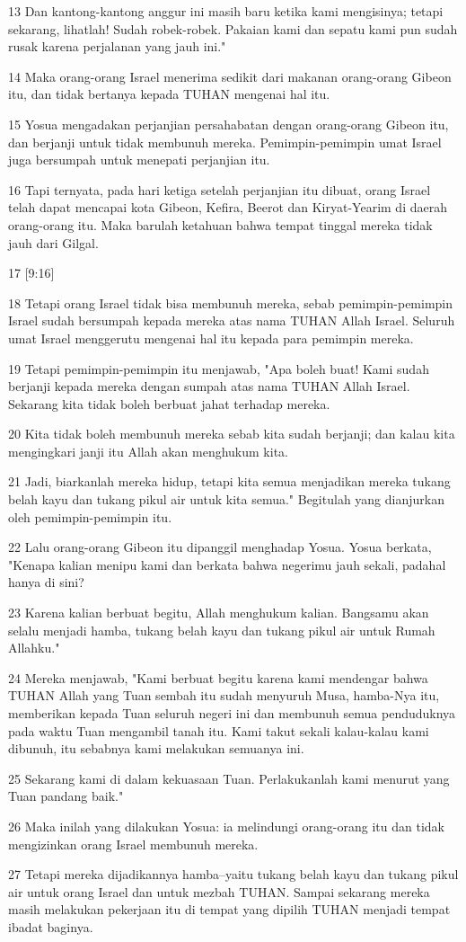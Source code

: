 \par 13 Dan kantong-kantong anggur ini masih baru ketika kami mengisinya; tetapi sekarang, lihatlah! Sudah robek-robek. Pakaian kami dan sepatu kami pun sudah rusak karena perjalanan yang jauh ini."
\par 14 Maka orang-orang Israel menerima sedikit dari makanan orang-orang Gibeon itu, dan tidak bertanya kepada TUHAN mengenai hal itu.
\par 15 Yosua mengadakan perjanjian persahabatan dengan orang-orang Gibeon itu, dan berjanji untuk tidak membunuh mereka. Pemimpin-pemimpin umat Israel juga bersumpah untuk menepati perjanjian itu.
\par 16 Tapi ternyata, pada hari ketiga setelah perjanjian itu dibuat, orang Israel telah dapat mencapai kota Gibeon, Kefira, Beerot dan Kiryat-Yearim di daerah orang-orang itu. Maka barulah ketahuan bahwa tempat tinggal mereka tidak jauh dari Gilgal.
\par 17 [9:16]
\par 18 Tetapi orang Israel tidak bisa membunuh mereka, sebab pemimpin-pemimpin Israel sudah bersumpah kepada mereka atas nama TUHAN Allah Israel. Seluruh umat Israel menggerutu mengenai hal itu kepada para pemimpin mereka.
\par 19 Tetapi pemimpin-pemimpin itu menjawab, "Apa boleh buat! Kami sudah berjanji kepada mereka dengan sumpah atas nama TUHAN Allah Israel. Sekarang kita tidak boleh berbuat jahat terhadap mereka.
\par 20 Kita tidak boleh membunuh mereka sebab kita sudah berjanji; dan kalau kita mengingkari janji itu Allah akan menghukum kita.
\par 21 Jadi, biarkanlah mereka hidup, tetapi kita semua menjadikan mereka tukang belah kayu dan tukang pikul air untuk kita semua." Begitulah yang dianjurkan oleh pemimpin-pemimpin itu.
\par 22 Lalu orang-orang Gibeon itu dipanggil menghadap Yosua. Yosua berkata, "Kenapa kalian menipu kami dan berkata bahwa negerimu jauh sekali, padahal hanya di sini?
\par 23 Karena kalian berbuat begitu, Allah menghukum kalian. Bangsamu akan selalu menjadi hamba, tukang belah kayu dan tukang pikul air untuk Rumah Allahku."
\par 24 Mereka menjawab, "Kami berbuat begitu karena kami mendengar bahwa TUHAN Allah yang Tuan sembah itu sudah menyuruh Musa, hamba-Nya itu, memberikan kepada Tuan seluruh negeri ini dan membunuh semua penduduknya pada waktu Tuan mengambil tanah itu. Kami takut sekali kalau-kalau kami dibunuh, itu sebabnya kami melakukan semuanya ini.
\par 25 Sekarang kami di dalam kekuasaan Tuan. Perlakukanlah kami menurut yang Tuan pandang baik."
\par 26 Maka inilah yang dilakukan Yosua: ia melindungi orang-orang itu dan tidak mengizinkan orang Israel membunuh mereka.
\par 27 Tetapi mereka dijadikannya hamba--yaitu tukang belah kayu dan tukang pikul air untuk orang Israel dan untuk mezbah TUHAN. Sampai sekarang mereka masih melakukan pekerjaan itu di tempat yang dipilih TUHAN menjadi tempat ibadat baginya.

